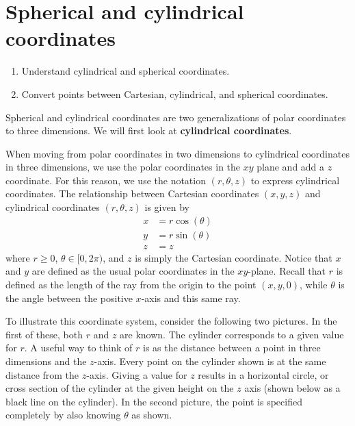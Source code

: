 \section{Spherical and cylindrical coordinates}

\begin{outcome}
  \begin{enumerate}
  \item Understand cylindrical and spherical coordinates.
  \item Convert points between Cartesian, cylindrical, and spherical
    coordinates.
  \end{enumerate}
\end{outcome}

Spherical and cylindrical coordinates are two generalizations of polar coordinates to three dimensions. We will first look at \textbf{cylindrical coordinates}.

When moving from polar coordinates in two dimensions to cylindrical coordinates in three dimensions, we use the polar coordinates in the $xy$
plane and add a $z$ coordinate. For this reason, we use the notation $(r, \theta, z)$ to express cylindrical coordinates.
The relationship between Cartesian coordinates $(x,y,z)$ and cylindrical coordinates $(r, \theta, z)$ is given by
\begin{align*}
x& =r\cos (\theta)  \\
y& =r\sin (\theta)  \\
z& =z
\end{align*}
where $r\geq 0$, $\theta \in \lbrack 0,2\pi )$, and $z$ is simply the Cartesian
coordinate. Notice that $x$ and $y$ are defined as the usual polar coordinates in the $xy$-plane. Recall that $r$ is defined as the length of the ray from the origin to the point $(x,y,0)$, while $\theta$ is the angle between the positive $x$-axis and this same ray.

To illustrate this coordinate system, consider the following two pictures.
In the first of these, both $r$ and $z$ are known. The cylinder corresponds to a given value for $r$. A useful way to think of $r$ is
as the distance between a point in three dimensions and the $z$-axis. Every point on the cylinder shown is at the same distance from the $z$-axis. Giving a value for $z$ results in a horizontal circle, or cross section of the cylinder at the given height on the $z$ axis (shown below as a black line on the cylinder). In the second picture, the point is specified completely by also knowing $\theta$ as shown.

